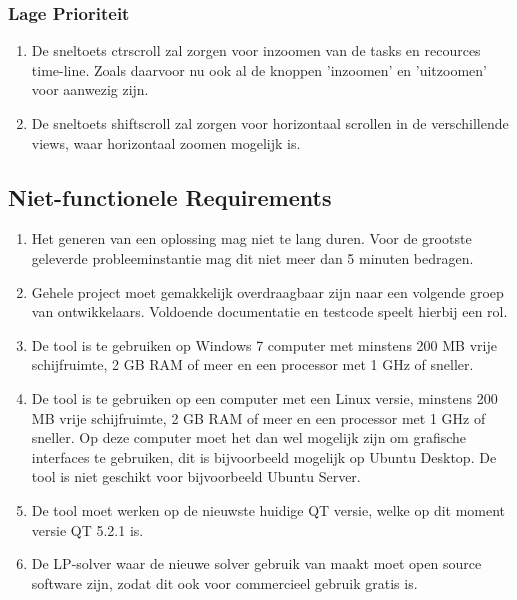 \subsubsection*{Lage Prioriteit}
\begin{enumerate}[resume]
    \item De sneltoets ctr\plus  scroll zal zorgen voor inzoomen van de tasks en recources time-line. Zoals daarvoor nu ook al de knoppen 'inzoomen' en 'uitzoomen' voor aanwezig zijn. 
    \item De sneltoets shift\plus scroll zal zorgen voor horizontaal scrollen in de verschillende views, waar horizontaal zoomen mogelijk is.
\end{enumerate}

\subsection{Niet-functionele Requirements}
\begin{enumerate}
    \item Het generen van een oplossing mag niet te lang duren. Voor de grootste geleverde probleeminstantie mag dit niet meer dan 5 minuten bedragen.
    \item Gehele project moet gemakkelijk overdraagbaar zijn naar een volgende groep van ontwikkelaars. Voldoende documentatie en testcode speelt hierbij een rol.
    \item De tool is te gebruiken op Windows 7 computer met minstens 200 MB vrije schijfruimte, 2 GB RAM of meer en een processor met 1 GHz of sneller.
    \item De tool is te gebruiken op een computer met een Linux versie, minstens 200 MB vrije schijfruimte, 2 GB RAM of meer en een processor met 1 GHz of sneller. Op deze computer moet het dan wel mogelijk zijn om grafische interfaces te gebruiken, dit is bijvoorbeeld mogelijk op Ubuntu Desktop. De tool is niet geschikt voor bijvoorbeeld Ubuntu Server. 
    \item De tool moet werken op de nieuwste huidige QT versie, welke op dit moment versie QT 5.2.1 is.
    \item De LP-solver waar de nieuwe solver gebruik van maakt moet open source software zijn, zodat dit ook voor commercieel gebruik gratis is. 
\end{enumerate}
